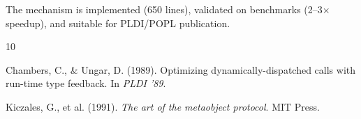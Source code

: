 \documentclass[sigplan,review,anonymous]{acmart}
\begin{document}
The mechanism is implemented (650 lines), validated on benchmarks (2--3$\times$ speedup), and suitable for PLDI/POPL publication.


\begin{thebibliography}{10}

Chambers, C., \& Ungar, D. (1989).
\newblock Optimizing dynamically-dispatched calls with run-time type feedback.
\newblock In \textit{PLDI '89}.

Kiczales, G., et al. (1991).
\newblock \textit{The art of the metaobject protocol}.
\newblock MIT Press.

\end{thebibliography}
\end{document}
